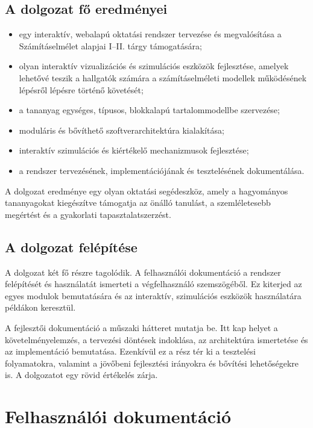 \documentclass[12pt,a4paper]{report}
\begin{document}
\chapter{A dolgozat fő eredményei}

\begin{itemize}
    \item egy interaktív, webalapú oktatási rendszer tervezése és
          megvalósítása a Számításelmélet alapjai I--II. tárgy támogatására;
    \item olyan interaktív vizualizációs és szimulációs eszközök fejlesztése, amelyek
     lehetővé teszik a hallgatók számára a számításelméleti modellek működésének lépésről 
     lépésre történő követését;
    \item a tananyag egységes, típusos, blokkalapú tartalommodellbe
          szervezése;
    \item moduláris és bővíthető szoftverarchitektúra kialakítása;
    \item interaktív szimulációs és kiértékelő mechanizmusok fejlesztése;
    \item a rendszer tervezésének, implementációjának és tesztelésének
          dokumentálása.
\end{itemize}

A dolgozat eredménye egy olyan oktatási segédeszköz, amely a
hagyományos tananyagokat kiegészítve támogatja az önálló tanulást, a
szemléletesebb megértést és a gyakorlati tapasztalatszerzést.

\chapter{A dolgozat felépítése}
A dolgozat két fő részre tagolódik.
A felhasználói dokumentáció a rendszer felépítését és használatát
ismerteti a végfelhasználó szemszögéből. Ez kiterjed az egyes modulok
bemutatására és az interaktív, szimulációs eszközök használatára
példákon keresztül.

A fejlesztői dokumentáció a műszaki hátteret mutatja be. Itt kap helyet
a követelményelemzés, a tervezési döntések indoklása, az architektúra
ismertetése és az implementáció bemutatása. Ezenkívül ez a rész tér ki
a tesztelési folyamatokra, valamint a jövőbeni fejlesztési irányokra
és bővítési lehetőségekre is.
A dolgozatot egy rövid értékelés zárja.

\part{Felhasználói dokumentáció}
\end{document}
